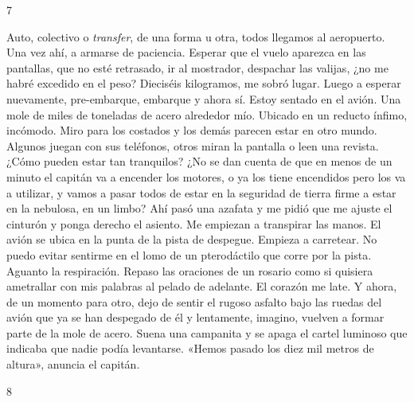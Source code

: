 \documentclass[12pt,twoside,openright,a5paper]{book}
\begin{document}
\vspace{0.5cm}
\afterpage{}
\hrulefill \hspace{0.1cm}\decofourleft\hspace{0.2cm} 7 \hspace{0.2cm}\decofourright \hspace{0.1cm}\hrulefill

\nopagebreak

\vspace{0.5cm}

\nopagebreak

Auto, colectivo o \emph{transfer}, de una forma u otra, todos llegamos al
aeropuerto. Una vez ahí, a armarse de paciencia. Esperar que el vuelo
aparezca en las pantallas, que no esté retrasado, ir al mostrador,
despachar las valijas, ¿no me habré excedido en el peso? Dieciséis kilogramos, me sobró
lugar. Luego a esperar nuevamente, pre-embarque, embarque y ahora sí. Estoy
sentado en el avión. Una mole de miles de toneladas de acero alrededor
mío. Ubicado en un reducto ínfimo, incómodo. Miro para los costados y
los demás parecen estar en otro mundo. Algunos juegan con sus teléfonos,
otros miran la pantalla o leen una revista. ¿Cómo pueden estar tan
tranquilos? ¿No se dan cuenta de que en menos de un minuto el capitán va
a encender los motores, o ya los tiene encendidos pero los va a utilizar, y
vamos a pasar todos de estar en la seguridad de tierra firme a estar en la
nebulosa, en un limbo? Ahí pasó una azafata y me pidió que me ajuste el
cinturón y ponga derecho el asiento. Me empiezan a transpirar las manos. El
avión se ubica en la punta de la pista de despegue. Empieza a carretear. No
puedo evitar sentirme en el lomo de un pterodáctilo que corre por la
pista. Aguanto la respiración. Repaso las oraciones de un rosario como si
quisiera ametrallar con mis palabras al pelado de adelante. El corazón me
late. Y ahora, de un momento para otro, dejo de sentir el rugoso asfalto
bajo las ruedas del avión que ya se han despegado de él y lentamente, imagino,
vuelven a formar parte de la mole de acero. Suena una campanita y se apaga
el cartel luminoso que indicaba que nadie podía levantarse. 
«Hemos pasado los diez mil metros de altura», anuncia el capitán.

\vspace{0.5cm}

\hrulefill \hspace{0.1cm}\decofourleft\hspace{0.2cm} 8 \hspace{0.2cm}\decofourright \hspace{0.1cm}\hrulefill
\end{document}
